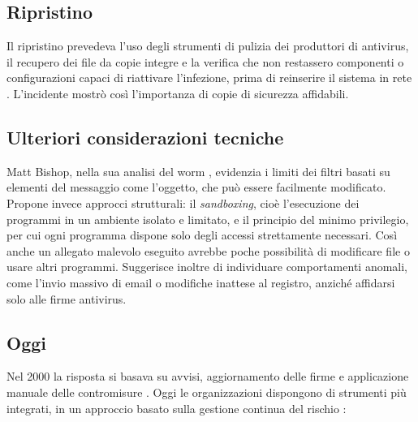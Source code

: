 \subsection{Ripristino}
Il ripristino prevedeva l’uso degli strumenti di pulizia dei produttori di antivirus, il recupero dei file da copie integre e la verifica che non restassero componenti o configurazioni capaci di riattivare l'infezione, prima di reinserire il sistema in rete \cite{cichonski2012, nelson2025}. L’incidente mostrò così l’importanza di copie di sicurezza affidabili.

\subsection{Ulteriori considerazioni tecniche}
Matt Bishop, nella sua analisi del worm \cite{bishop2000}, evidenzia i limiti dei filtri basati su elementi del messaggio come l’oggetto, che può essere facilmente modificato. Propone invece approcci strutturali: il \emph{sandboxing}, cioè l'esecuzione dei programmi in un ambiente isolato e limitato, e il principio del minimo privilegio, per cui ogni programma dispone solo degli accessi strettamente necessari. Così anche un allegato malevolo eseguito avrebbe poche possibilità di modificare file o usare altri programmi. Suggerisce inoltre di individuare comportamenti anomali, come l’invio massivo di email o modifiche inattese al registro, anziché affidarsi solo alle firme antivirus.

\subsection{Oggi}
Nel 2000 la risposta si basava su avvisi, aggiornamento delle firme e applicazione manuale delle contromisure \cite{cert2000, gao2000iloveyou}. Oggi le organizzazioni dispongono di strumenti più integrati, in un approccio basato sulla gestione continua del rischio \cite{nelson2025, nist2024csf}:

